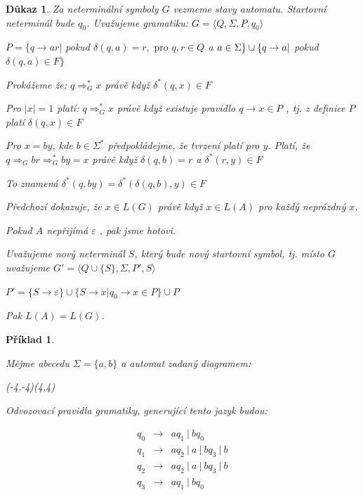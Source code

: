 \documentclass[10pt, a4paper, titlepage]{article}
\theoremstyle{note}
\newtheorem{dukaz}{\textbf{Důkaz}}
\newtheorem{priklad}{\textbf{Příklad}}
\begin{document}
\begin{dukaz}
Za neterminální symboly $G$ vezmeme stavy automatu. Startovní neterminál bude $q_0$. Uvažujeme gramatiku:
$G = \langle Q,\Sigma,P,q_0 \rangle$

$P = \lbrace q \rightarrow ar |$ pokud $\delta (q,a)=r, \text{ pro } q,r \in Q$ a $a \in \Sigma \rbrace \\ \cup \lbrace q \rightarrow a |$ pokud $\delta (q,a) \in F \rbrace$ 

Prokážeme že: $ q \Rightarrow_G^* x $ právě když $ \delta^* (q,x) \in F$

Pro $|x|=1$ platí: $ q \Rightarrow_G^* x $ právě když existuje pravidlo $q \rightarrow x \in P$ , tj. z definice $P$ platí $\delta (q,x) \in F$

Pro $x=by$, kde $b \in \Sigma^*$ předpokládejme, že tvrzení platí pro $y$. Platí, že $q \Rightarrow_G br \Rightarrow_G^* by = x$ právě když $\delta (q,b)=r$ a $\delta^* (r,y) \in F$

To znamená $\delta^* (q,by) = \delta^* ( \delta (q,b),y) \in F$

Předchozí dokazuje, že $x \in L(G)$ právě když $x \in L(A)$ pro každý neprázdný $x$.

Pokud $A$ nepřijímá $\varepsilon$ , pak jsme hotovi.

Uvažujeme nový neterminál $S$, který bude nový startovní symbol, tj. místo $G$ uvažujeme $G'= \langle Q \cup \lbrace S \rbrace,\Sigma,P',S \rangle$

$P'= \lbrace S \rightarrow \varepsilon \rbrace \cup \lbrace S \rightarrow x | q_0 \rightarrow x \in P \rbrace \cup P$

Pak $L(A)=L(G)$.
\end{dukaz}

\begin{priklad}\label{priklad-4}

Mějme abecedu $\Sigma = \lbrace a,b \rbrace$ a automat zadaný diagramem:
\begin{center}
\begin{VCPicture}{(-4,-4)(4,4)}
\end{VCPicture}
\end{center}

Odvozovací pravidla gramatiky, generující tento jazyk budou:

\begin{eqnarray*}
q_0 &\rightarrow& aq_1\ |\ bq_0 \\
q_1 &\rightarrow& aq_2\ |\ a\ |\ bq_3\ |\  b \\
q_2 &\rightarrow& aq_2\ |\ a\ |\ bq_3\ |\  b \\
q_3 &\rightarrow& aq_1\ |\ bq_0
\end{eqnarray*}

\end{priklad}
\end{document}
